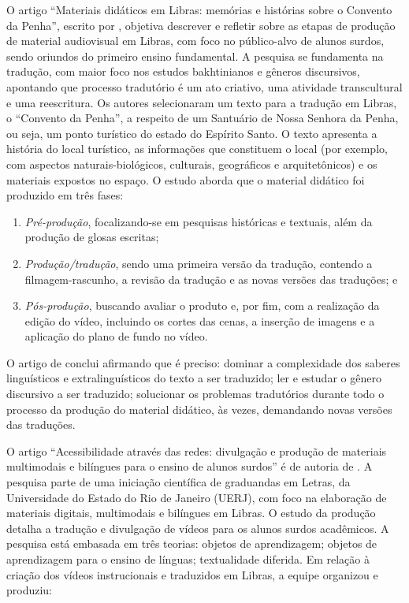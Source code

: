 \documentclass[portuguese]{textolivre}
\begin{document}
O artigo “Materiais didáticos em Libras: memórias e histórias sobre o Convento da Penha”, escrito por \textcite{silva2020materiais}, objetiva descrever e refletir sobre as etapas de produção de material audiovisual em Libras, com foco no público-alvo de alunos surdos, sendo oriundos do primeiro ensino fundamental. A pesquisa se fundamenta na tradução, com maior foco nos estudos bakhtinianos e gêneros discursivos, apontando que processo tradutório é um ato criativo, uma atividade transcultural e uma reescritura. Os autores selecionaram um texto para a tradução em Libras, o “Convento da Penha”, a respeito de um Santuário de Nossa Senhora da Penha, ou seja, um ponto turístico do estado do Espírito Santo. O texto apresenta a história do local turístico, as informações que constituem o local (por exemplo, com aspectos naturais-biológicos, culturais, geográficos e arquitetônicos) e os materiais expostos no espaço. O estudo aborda que o material didático foi produzido em três fases: 

\begin{enumerate}
    \item \textit{Pré-produção}, focalizando-se em pesquisas históricas e textuais, além da produção de glosas escritas; 
    \item \textit{Produção/tradução}, sendo uma primeira versão da tradução, contendo a filmagem-rascunho, a revisão da tradução e as novas versões das traduções; e
    \item \textit{Pós-produção}, buscando avaliar o produto e, por fim, com a realização da edição do vídeo, incluindo os cortes das cenas, a inserção de imagens e a aplicação do plano de fundo no vídeo. 
\end{enumerate}

O artigo de \textcite{silva2020materiais} conclui afirmando que é preciso: dominar a complexidade dos saberes linguísticos e extralinguísticos do texto a ser traduzido; ler e estudar o gênero discursivo a ser traduzido; solucionar os problemas tradutórios durante todo o processo da produção do material didático, às vezes, demandando novas versões das traduções.

O artigo “Acessibilidade através das redes: divulgação e produção de materiais multimodais e bilíngues para o ensino de alunos surdos” é de autoria de \textcite{baalbaki2024acessibilidade}. A pesquisa parte de uma iniciação científica de graduandas em Letras, da Universidade do Estado do Rio de Janeiro (UERJ), com foco na elaboração de materiais digitais, multimodais e bilíngues em Libras. O estudo da produção detalha a tradução e divulgação de vídeos para os alunos surdos acadêmicos. A pesquisa está embasada em três teorias: objetos de aprendizagem; objetos de aprendizagem para o ensino de línguas; textualidade diferida. Em relação à criação dos vídeos instrucionais e traduzidos em Libras, a equipe organizou e produziu:
\end{document}
